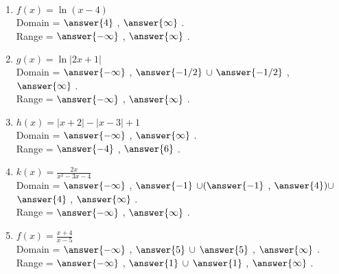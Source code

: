 \documentclass{ximera}
\begin{document}
\begin{exercise}
\begin{enumerate}
\item $f(x) = \ln(x-4)$ \\
Domain = \wordChoice{\choice[correct]{(}\choice{[}} $\answer{4}$ , $\answer{\infty}$ \wordChoice{\choice[correct]{)}\choice{]}}.\\
Range = \wordChoice{\choice[correct]{(}\choice{[}} $\answer{-\infty}$ , $\answer{\infty}$ \wordChoice{\choice[correct]{)}\choice{]}}.


\item $g(x) =  \ln|2x+1|$ \\
Domain = \wordChoice{\choice[correct]{(}\choice{[}} 
$\answer{-\infty}$ , $\answer{-1/2}$ 
\wordChoice{\choice[correct]{)}\choice{]}} 
$\cup$  
\wordChoice{\choice[correct]{(}\choice{[}} 
$\answer{-1/2}$ , $\answer{\infty}$ 
\wordChoice{\choice[correct]{)}\choice{]}}.\\
Range = \wordChoice{\choice[correct]{(}\choice{[}} 
$\answer{-\infty}$ , $\answer{\infty}$ 
\wordChoice{\choice[correct]{)}\choice{]}}.


\item $h(x) =  |x+2|-|x-3|+1$ \\
Domain = \wordChoice{\choice[correct]{(}\choice{[}} 
$\answer{-\infty}$ , $\answer{\infty}$ 
\wordChoice{\choice[correct]{)}\choice{]}}.\\
Range = \wordChoice{\choice{(}\choice[correct]{[}} $\answer{-4}$ , $\answer{6}$ \wordChoice{\choice{)}\choice[correct]{]}}.


\item $k(x)= \frac{2x}{x^2-3x-4}$\\
Domain = \wordChoice{\choice[correct]{(}\choice{[}} 
$\answer{-\infty}$ , $\answer{-1}$ 
\wordChoice{\choice[correct]{)}\choice{]}} 
$\cup ( \answer{-1}$ , $\answer{4} 
)\cup$  
\wordChoice{\choice[correct]{(}\choice{[}} 
$\answer{4}$ , $\answer{\infty}$ 
\wordChoice{\choice[correct]{)}\choice{]}}.\\
Range = \wordChoice{\choice[correct]{(}\choice{[}} 
$\answer{-\infty}$ , $\answer{\infty}$ 
\wordChoice{\choice[correct]{)}\choice{]}}.


\item $f(x) =  \frac{x+4}{x-5}$\\
Domain = \wordChoice{\choice[correct]{(}\choice{[}} 
$\answer{-\infty}$ , $\answer{5}$ 
\wordChoice{\choice[correct]{)}\choice{]}} 
$\cup$  
\wordChoice{\choice[correct]{(}\choice{[}} 
$\answer{5}$ , $\answer{\infty}$ 
\wordChoice{\choice[correct]{)}\choice{]}}.\\
Range = \wordChoice{\choice[correct]{(}\choice{[}} 
$\answer{-\infty}$ , $\answer{1}$ 
\wordChoice{\choice[correct]{)}\choice{]}} 
$\cup$  
\wordChoice{\choice[correct]{(}\choice{[}} 
$\answer{1}$ , $\answer{\infty}$ 
\wordChoice{\choice[correct]{)}\choice{]}}.

\end{enumerate}

\end{exercise}
\end{document}
